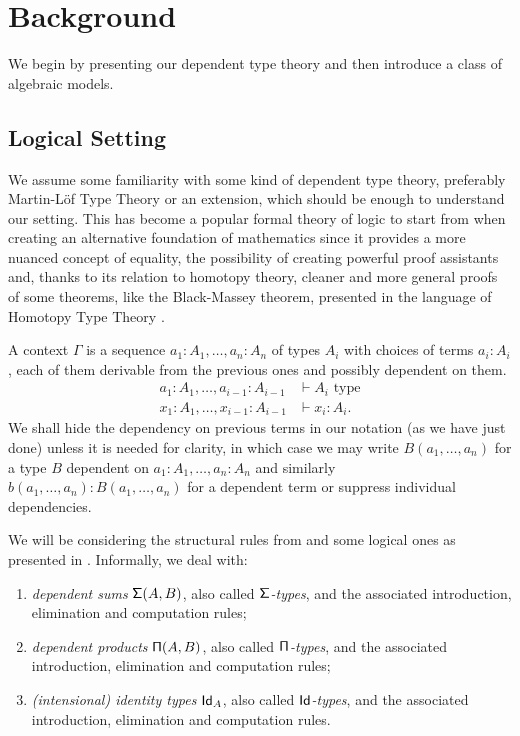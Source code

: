 \chapter{Background}

We begin by presenting our dependent type theory and then introduce a class of
algebraic models.

\section{Logical Setting}

We assume some familiarity with some kind of dependent type theory, preferably
Martin-L\"{o}f Type Theory \cite{ML84} or an extension, which
should be enough to understand our setting. This has become a popular formal
theory of logic to start from when creating an alternative foundation of
mathematics since it provides a more nuanced concept of equality, the
possibility of creating powerful proof assistants and, thanks to its relation to
homotopy theory, cleaner and more general proofs of some theorems, like the
Black-Massey theorem, presented in the language of Homotopy Type Theory
\cite{Uni13}.

\begin{notation}
  A context $\Gamma$ is a sequence $a_1:A_1,\ldots,a_n:A_n$ of types $A_i$ with
  choices of terms
  $a_i:A_i$, each of them derivable from the previous ones and possibly
  dependent on them.
  \begin{align*}
    a_1:A_1,\ldots,a_{i-1}:A_{i-1} &\vdash A_i \text{ type} \\
    x_1:A_1,\ldots,x_{i-1}:A_{i-1} &\vdash x_i:A_i.
  \end{align*}
  We shall hide the
  dependency on previous terms in our notation (as we have just done) unless
  it is needed for clarity, in which case we
  may write $B(a_1,\ldots,a_n)$ for a type $B$ dependent on
  $a_1:A_1,\ldots,a_n:A_n$ and similarly $b(a_1,\ldots,a_n):B(a_1,\ldots,a_n)$
  for a dependent term or suppress individual dependencies.
\end{notation}

We will be considering the structural rules from \cite[App.\ A.1]{KL12} and some
logical ones as presented in \cite[App.\ A.2]{KL12}. Informally, we deal with:
\begin{enumerate}
  \item \emph{dependent sums} $\operatorname{\mathsf{\Sigma}}(A,B)$, also called
    \emph{$\operatorname{\mathsf{\Sigma}}$-types}, and the associated introduction, elimination and
    computation rules;
  \item \emph{dependent products} $\operatorname{\mathsf{\Pi}}(A,B)$, also called \emph{$\operatorname{\mathsf{\Pi}}$-types},
    and the associated introduction, elimination and computation rules;
  \item \emph{(intensional) identity types} $\operatorname{\mathsf{Id}}_A$, also called
    \emph{$\operatorname{\mathsf{Id}}$-types}, and the associated introduction, elimination and
    computation rules.
\end{enumerate}

